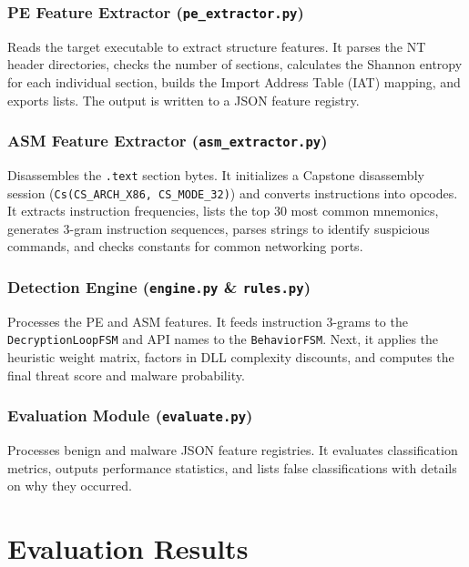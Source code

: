 \documentclass[11pt,a4paper]{article}
\begin{document}
\subsubsection{PE Feature Extractor (\texttt{pe\_extractor.py})}
Reads the target executable to extract structure features. It parses the NT header directories, checks the number of sections, calculates the Shannon entropy for each individual section, builds the Import Address Table (IAT) mapping, and exports lists. The output is written to a JSON feature registry.

\subsubsection{ASM Feature Extractor (\texttt{asm\_extractor.py})}
Disassembles the \texttt{.text} section bytes. It initializes a Capstone disassembly session (\texttt{Cs(CS\_ARCH\_X86, CS\_MODE\_32)}) and converts instructions into opcodes. It extracts instruction frequencies, lists the top 30 most common mnemonics, generates 3-gram instruction sequences, parses strings to identify suspicious commands, and checks constants for common networking ports.

\subsubsection{Detection Engine (\texttt{engine.py} \& \texttt{rules.py})}
Processes the PE and ASM features. It feeds instruction 3-grams to the \texttt{DecryptionLoopFSM} and API names to the \texttt{BehaviorFSM}. Next, it applies the heuristic weight matrix, factors in DLL complexity discounts, and computes the final threat score and malware probability.

\subsubsection{Evaluation Module (\texttt{evaluate.py})}
Processes benign and malware JSON feature registries. It evaluates classification metrics, outputs performance statistics, and lists false classifications with details on why they occurred.

\newpage

\section{Evaluation Results}
\end{document}
